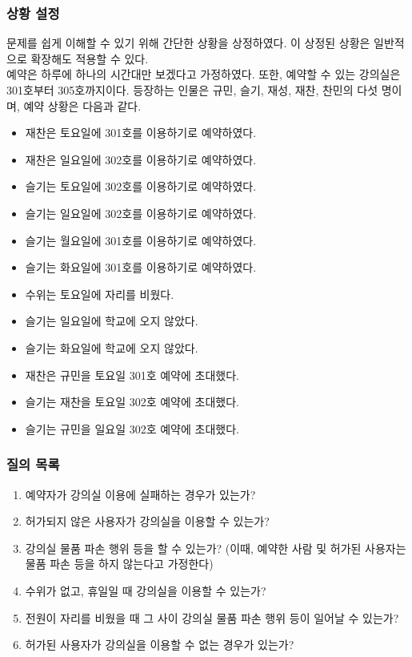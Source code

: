 \documentclass[11pt,a4paper]{article}
\begin{document}
\subsubsection{상황 설정}
문제를 쉽게 이해할 수 있기 위해 간단한 상황을 상정하였다. 이 상정된 상황은 일반적으로 확장해도 적용할 수 있다.\\
예약은 하루에 하나의 시간대만 보겠다고 가정하였다. 또한, 예약할 수 있는 강의실은 301호부터 305호까지이다. 등장하는 인물은 규민, 슬기, 재성, 재찬, 찬민의 다섯 명이며, 예약 상황은 다음과 같다.
\begin{itemize} 
\item 재찬은 토요일에 301호를 이용하기로 예약하였다.
\item 재찬은 일요일에 302호를 이용하기로 예약하였다.
\item 슬기는 토요일에 302호를 이용하기로 예약하였다.
\item 슬기는 일요일에 302호를 이용하기로 예약하였다.
\item 슬기는 월요일에 301호를 이용하기로 예약하였다.
\item 슬기는 화요일에 301호를 이용하기로 예약하였다.
\item 수위는 토요일에 자리를 비웠다.
\item 슬기는 일요일에 학교에 오지 않았다.
\item 슬기는 화요일에 학교에 오지 않았다.
\item 재찬은 규민을 토요일 301호 예약에 초대했다.
\item 슬기는 재찬을 토요일 302호 예약에 초대했다.
\item 슬기는 규민을 일요일 302호 예약에 초대했다.
\end{itemize}

\subsubsection{질의 목록}
\begin{enumerate}
\item 예약자가 강의실 이용에 실패하는 경우가 있는가?
\item 허가되지 않은 사용자가 강의실을 이용할 수 있는가?
\item 강의실 물품 파손 행위 등을 할 수 있는가? (이때, 예약한 사람 및 허가된 사용자는 물품 파손 등을 하지 않는다고 가정한다)
\item 수위가 없고, 휴일일 때 강의실을 이용할 수 있는가?
\item 전원이 자리를 비웠을 때 그 사이 강의실 물품 파손 행위 등이 일어날 수 있는가?
\item 허가된 사용자가 강의실을 이용할 수 없는 경우가 있는가?
\end{enumerate}
\end{document}
